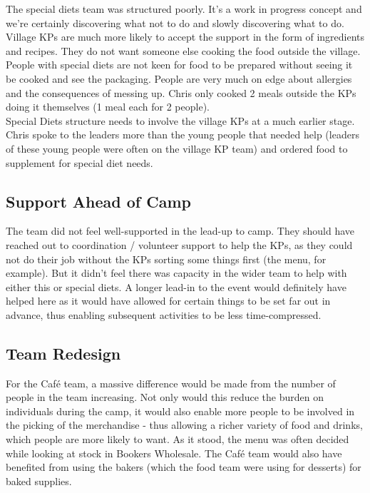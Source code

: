 The special diets team was structured poorly. It's a work in progress concept and we're certainly discovering what not to do and slowly discovering what to do.
Village KPs are much more likely to accept the support in the form of ingredients and recipes. They do not want someone else cooking the food outside the village. 
People with special diets are not keen for food to be prepared without seeing it be cooked and see the packaging. People are very much on edge about allergies and the consequences of messing up. Chris only cooked 2 meals outside the KPs doing it themselves (1 meal each for 2 people). \\

Special Diets structure needs to  involve the village KPs at a much earlier stage. Chris spoke to the leaders more than the young people that needed help (leaders of these young people were often on the village KP team) and ordered food to supplement for special diet needs. 

\subsection{Support Ahead of Camp}
The team did not feel well-supported in the lead-up to camp. They should have reached out to coordination / volunteer support to help the KPs, as they could not do their job without the KPs sorting some things first (the menu, for example). But it didn't feel there was capacity in the wider team to help with either this or special diets. A longer lead-in to the event would definitely have helped here as it would have allowed for certain things to be set far out in advance, thus enabling subsequent activities to be less time-compressed.

\subsection{Team Redesign}
For the Café team, a massive difference would be made from the number of people in the team increasing. Not only would this reduce the burden on individuals during the camp, it would also enable more people to be involved in the picking of the merchandise - thus allowing a richer variety of food and drinks, which people are more likely to want. As it stood, the menu was often decided while looking at stock in Bookers Wholesale. The Café team would also have benefited from using the bakers (which the food team were using for desserts) for baked supplies.\\

